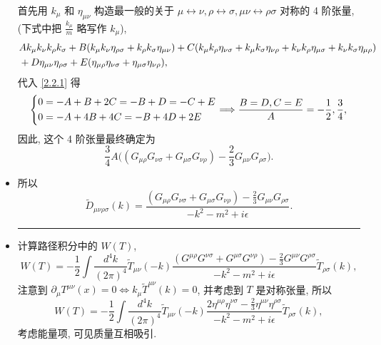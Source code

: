 \begin{itemize}
	\begin{tcolorbox}[title=calculation:]
		首先用 $k_\mu$ 和 $\eta_{\mu \nu}$ 构造最一般的关于 $\mu \leftrightarrow \nu, \rho \leftrightarrow \sigma, \mu \nu \leftrightarrow \rho \sigma$ 对称的 4 阶张量, (下式中把 $\frac{k_\mu}{m}$ 略写作 $k_\mu$),
		\begin{align}
			&A k_\mu k_\nu k_\rho k_\sigma + B (k_\mu k_\nu \eta_{\rho \sigma} + k_\rho k_\sigma \eta_{\mu \nu}) + C (k_\mu k_\rho \eta_{\nu \sigma} + k_\mu k_\sigma \eta_{\nu \rho} + k_\nu k_\rho \eta_{\mu \sigma} + k_\nu k_\sigma \eta_{\mu \rho}) \notag \\
			& + D \eta_{\mu \nu} \eta_{\rho \sigma} + E (\eta_{\mu \rho} \eta_{\nu \sigma} + \eta_{\mu \sigma} \eta_{\nu \rho}),
		\end{align}
		代入 \eqref{2.2.1} 得
		\begin{equation}
			\begin{dcases}
				0 = - A + B + 2 C = - B + D = - C + E \\
				0 = - A + 4 B + 4 C = - B + 4 D + 2 E
			\end{dcases} \Longrightarrow \frac{B = D, C = E}{A} = - \frac{1}{2}, \frac{3}{4},
		\end{equation}
		因此, 这个 4 阶张量最终确定为
		\begin{equation}
			\frac{3}{4} A \Big( (G_{\mu \rho} G_{\nu \sigma} + G_{\mu \sigma} G_{\nu \rho}) - \frac{2}{3} G_{\mu \nu} G_{\rho \sigma} \Big).
		\end{equation}
	\end{tcolorbox}
	\item 所以
	\begin{equation}
		\tilde{D}_{\mu \nu \rho \sigma}(k) = \frac{(G_{\mu \rho} G_{\nu \sigma} + G_{\mu \sigma} G_{\nu \rho}) - \frac{2}{3} G_{\mu \nu} G_{\rho \sigma}}{- k^2 - m^2 + i \epsilon}.
	\end{equation}
	
	\noindent\rule[0.5ex]{\linewidth}{0.5pt} %
	
	\item 计算路径积分中的 $W(T)$,
	\begin{equation}
		W(T) = - \frac{1}{2} \int \frac{d^4 k}{(2 \pi)^4} \tilde{T}_{\mu \nu}(- k) \frac{(G^{\mu \rho} G^{\nu \sigma} + G^{\mu \sigma} G^{\nu \rho}) - \frac{2}{3} G^{\mu \nu} G^{\rho \sigma}}{- k^2 - m^2 + i \epsilon} \tilde{T}_{\rho \sigma}(k),
	\end{equation}
	注意到 $\partial_\mu T^{\mu \nu}(x) = 0 \iff k_\mu \tilde{T}^{\mu \nu}(k) = 0$, 并考虑到 $T$ 是对称张量, 所以
	\begin{equation}
		W(T) = - \frac{1}{2} \int \frac{d^4 k}{(2 \pi)^4} \tilde{T}_{\mu \nu}(- k) \frac{2 \eta^{\mu \rho} \eta^{\nu \sigma} - \frac{2}{3} \eta^{\mu \nu} \eta^{\rho \sigma}}{- k^2 - m^2 + i \epsilon} \tilde{T}_{\rho \sigma}(k),
	\end{equation}
	考虑能量项, 可见质量互相吸引.
\end{itemize}


